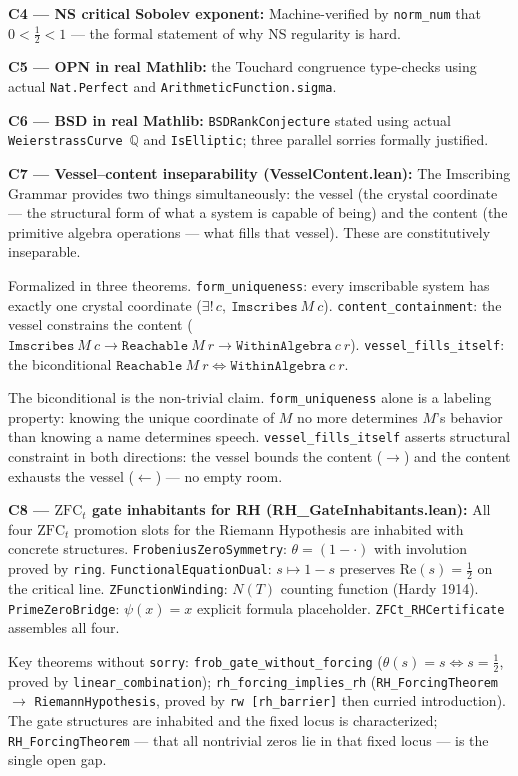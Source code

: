 \documentclass[12pt,a4paper]{article}
\begin{document}
\textbf{C4 --- NS critical Sobolev exponent:} Machine-verified by \texttt{norm\_num} that $0 < \frac{1}{2} < 1$ --- the formal statement of why NS regularity is hard.

\textbf{C5 --- OPN in real Mathlib:} the Touchard congruence type-checks using actual \texttt{Nat.Perfect} and \texttt{ArithmeticFunction.sigma}.

\textbf{C6 --- BSD in real Mathlib:} \texttt{BSDRankConjecture} stated using actual \texttt{WeierstrassCurve}~$\mathbb{Q}$ and \texttt{IsElliptic}; three parallel sorries formally justified.

\textbf{C7 --- Vessel--content inseparability (VesselContent.lean):} The Imscribing Grammar provides two things simultaneously: the vessel (the crystal coordinate --- the structural form of what a system is capable of being) and the content (the primitive algebra operations --- what fills that vessel). These are constitutively inseparable.

Formalized in three theorems. \texttt{form\_uniqueness}: every imscribable system has exactly one crystal coordinate ($\exists!\, c,\ \mathtt{Imscribes}\ M\ c$). \texttt{content\_containment}: the vessel constrains the content ($\mathtt{Imscribes}\ M\ c \to \mathtt{Reachable}\ M\ r \to \mathtt{WithinAlgebra}\ c\ r$). \texttt{vessel\_fills\_itself}: the biconditional $\mathtt{Reachable}\ M\ r \iff \mathtt{WithinAlgebra}\ c\ r$.

The biconditional is the non-trivial claim. \texttt{form\_uniqueness} alone is a labeling property: knowing the unique coordinate of $M$ no more determines $M$'s behavior than knowing a name determines speech. \texttt{vessel\_fills\_itself} asserts structural constraint in both directions: the vessel bounds the content ($\to$) and the content exhausts the vessel ($\leftarrow$) --- no empty room.

\textbf{C8 --- $\mathrm{ZFC}_t$ gate inhabitants for RH (RH\_GateInhabitants.lean):} All four $\mathrm{ZFC}_t$ promotion slots for the Riemann Hypothesis are inhabited with concrete structures. \texttt{FrobeniusZeroSymmetry}: $\theta = (1 - \cdot)$ with involution proved by \texttt{ring}. \texttt{FunctionalEquationDual}: $s \mapsto 1 - s$ preserves $\mathrm{Re}(s) = \frac{1}{2}$ on the critical line. \texttt{ZFunctionWinding}: $N(T)$ counting function (Hardy 1914). \texttt{PrimeZeroBridge}: $\psi(x) = x$ explicit formula placeholder. \texttt{ZFCt\_RHCertificate} assembles all four.

Key theorems without \texttt{sorry}: \texttt{frob\_gate\_without\_forcing} ($\theta(s) = s \iff s = \frac{1}{2}$, proved by \texttt{linear\_combination}); \texttt{rh\_forcing\_implies\_rh} (\texttt{RH\_ForcingTheorem} $\to$ \texttt{RiemannHypothesis}, proved by \texttt{rw [rh\_barrier]} then curried introduction). The gate structures are inhabited and the fixed locus is characterized; \texttt{RH\_ForcingTheorem} --- that all nontrivial zeros lie in that fixed locus --- is the single open gap.
\end{document}
